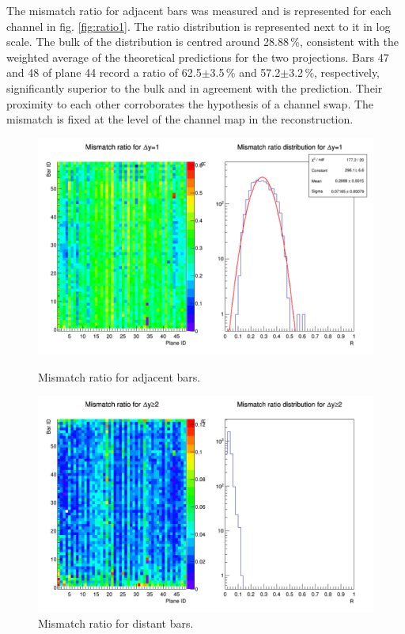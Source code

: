 \documentclass[a4paper,11pt]{article}
\begin{document}
The mismatch ratio for adjacent bars was measured and is represented for each channel in fig. \ref{fig:ratio1}. The ratio distribution is represented next to it in log scale. The bulk of the distribution is centred around 28.88\,\%, consistent with the weighted average of the theoretical predictions for the two projections. Bars 47 and 48 of plane 44 record a ratio of 62.5$\pm$3.5\,\% and 57.2$\pm$3.2\,\%, respectively, significantly superior to the bulk and in agreement with the prediction. Their proximity to each other corroborates the hypothesis of a channel swap. The mismatch is fixed at the level of the channel map in the reconstruction.

\begin{figure}[tbd]
  \begin{minipage}[b]{.49\textwidth}
   \centering
   \includegraphics[width=\textwidth]{ratio1.png}
   \caption{Mismatch ratio for adjacent bars.}
   \label{fig:ratio1}
  \end{minipage}
  \begin{minipage}[b]{.49\textwidth}
   \centering
   \includegraphics[width=\textwidth]{ratio2.png}
   \caption{Mismatch ratio for distant bars.}
   \label{fig:ratio2}
  \end{minipage}
\end{figure}
\end{document}
